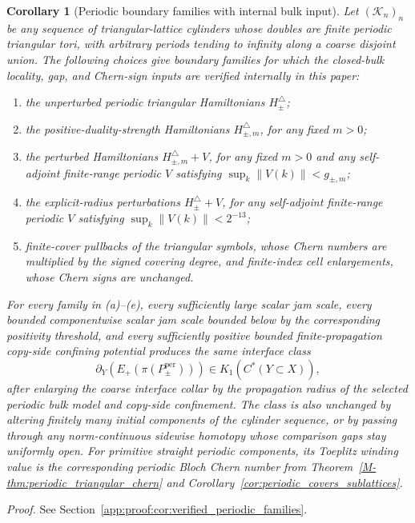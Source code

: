 \documentclass[11pt]{article}
\numberwithin{equation}{section}
\newtheorem{corollary}[theorem]{Corollary}
\theoremstyle{definition}
\theoremstyle{remark}
\newcommand{\proofref}[1]{%
  \par\noindent\emph{Proof.} See Section~\ref{#1}.\par\medskip
}
\newcommand{\proofappendixref}[1]{\proofref{#1}}
\newcommand{\K}{\mathcal{K}}
\newcommand{\opnorm}[1]{\left\lVert#1\right\rVert}
\begin{document}
\begin{corollary}[Periodic boundary families with internal bulk input]\label{cor:verified_periodic_families}
Let \((\K_n)_n\) be any sequence of triangular-lattice cylinders whose doubles are finite periodic
triangular tori, with arbitrary periods tending to infinity along a coarse disjoint union. The
following choices give boundary families for which the closed-bulk locality, gap, and Chern-sign
inputs are verified internally in this paper:
\begin{enumerate}[label=(\alph*),leftmargin=2em]
\item the unperturbed periodic triangular Hamiltonians \(H_\pm^\triangle\);
\item the positive-duality-strength Hamiltonians \(H_{\pm,m}^\triangle\), for any fixed \(m>0\);
\item the perturbed Hamiltonians \(H_{\pm,m}^\triangle+V\), for any fixed \(m>0\) and any
  self-adjoint finite-range periodic \(V\) satisfying
  \(\sup_k\opnorm{V(k)}<g_{\pm,m}\);
\item the explicit-radius perturbations \(H_\pm^\triangle+V\), for any self-adjoint finite-range
  periodic \(V\) satisfying \(\sup_k\opnorm{V(k)}<2^{-13}\);
\item finite-cover pullbacks of the triangular symbols, whose Chern numbers are multiplied by the
  signed covering degree, and finite-index cell enlargements, whose Chern signs are unchanged.
\end{enumerate}
For every family in (a)--(e), every sufficiently large scalar jam scale, every bounded
componentwise scalar jam scale bounded below by the corresponding positivity threshold, and every
sufficiently positive bounded finite-propagation copy-side confining potential produces the same
interface class
\[
\partial_Y(E_+(\pi(P_\pm^{\mathrm{per}})))\in K_1(C^*(Y\subset X)),
\]
after enlarging the coarse interface collar by the propagation radius of the selected periodic bulk
model and copy-side confinement. The class is also unchanged by altering finitely many initial
components of the cylinder sequence, or by passing through any norm-continuous sidewise homotopy
whose comparison gaps stay uniformly open. For primitive straight periodic components, its Toeplitz
winding value is the corresponding periodic Bloch Chern number from
Theorem~\ref{M-thm:periodic_triangular_chern} and
Corollary~\ref{cor:periodic_covers_sublattices}.
\end{corollary}
\proofappendixref{app:proof:cor:verified_periodic_families}
\end{document}
